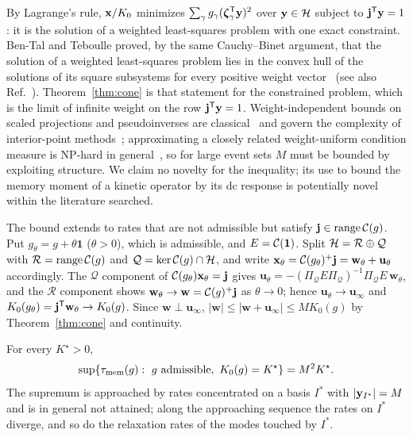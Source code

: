\begin{remark}\label{rem:bt}
By Lagrange's rule, $\mathbf x/K_0$ minimizes $\sum_\gamma g_\gamma(\bm\zeta_\gamma^{\mathsf T}\mathbf y)^2$ over $\mathbf y\in\mathcal H$
subject to $\mathbf j^{\mathsf T}\mathbf y=1$: it is the solution of a weighted least-squares problem with one exact
constraint. Ben-Tal and Teboulle proved, by the same Cauchy--Binet argument, that the solution of a
weighted least-squares problem lies in the convex hull of the solutions of its square subsystems for
every positive weight vector~\cite[Theorem~2.1 and Corollary~2.1]{BenTalTeboulle1990} (see also
Ref.~\cite{Berg1986}). Theorem~\ref{thm:cone} is that statement for the constrained problem, which is the
limit of infinite weight on the row $\mathbf j^{\mathsf T}\mathbf y=1$. Weight-independent bounds on scaled projections and
pseudoinverses are classical~\cite{Stewart1989,OLeary1990,Todd1990,HankeNeumann1993} and govern the
complexity of interior-point methods~\cite{VavasisYe1996}; approximating a closely related
weight-uniform condition measure is NP-hard in general~\cite{Tuncel1999}, so for large event sets $M$
must be bounded by exploiting structure. We claim no novelty for the inequality; its use to bound the
memory moment of a kinetic operator by its dc response is potentially novel within the literature
searched.
\end{remark}

The bound extends to rates that are not admissible but satisfy $\mathbf j\in\mathrm{range}\,\mathcal C(g)$. Put
$g_\theta=g+\theta\mathbf 1$ ($\theta>0$), which is admissible, and $E=\mathcal C(\mathbf 1)$. Split
$\mathcal H=\mathcal R\oplus\mathcal Q$ with $\mathcal R=\mathrm{range}\,\mathcal C(g)$ and
$\mathcal Q=\ker\mathcal C(g)\cap\mathcal H$, and write $\mathbf x_\theta=\mathcal C(g_\theta)^+\mathbf j=\mathbf w_\theta+\mathbf u_\theta$
accordingly. The $\mathcal Q$ component of $\mathcal C(g_\theta)\mathbf x_\theta=\mathbf j$ gives
$\mathbf u_\theta=-(\Pi_{\mathcal Q}E\Pi_{\mathcal Q})^{-1}\Pi_{\mathcal Q}E\,\mathbf w_\theta$, and the
$\mathcal R$ component shows $\mathbf w_\theta\to\mathbf w=\mathcal C(g)^+\mathbf j$ as $\theta\to0$; hence
$\mathbf u_\theta\to\mathbf u_\infty$ and $K_0(g_\theta)=\mathbf j^{\mathsf T}\mathbf w_\theta\to K_0(g)$. Since
$\mathbf w\perp\mathbf u_\infty$, $|\mathbf w|\le|\mathbf w+\mathbf u_\infty|\le M K_0(g)$ by
Theorem~\ref{thm:cone} and continuity.

\begin{proposition}\label{prop:sharp}
For every $K^\star>0$,
\begin{equation}
\sup\{\tmem(g):\ g\ \text{admissible},\ K_0(g)=K^\star\}=M^2K^\star .
\label{eq:sharp}
\end{equation}
The supremum is approached by rates concentrated on a basis $I^\ast$ with $|\mathbf y_{I^\ast}|=M$ and is in
general not attained; along the approaching sequence the rates on $I^\ast$ diverge, and so do the
relaxation rates of the modes touched by $I^\ast$.
\end{proposition}

